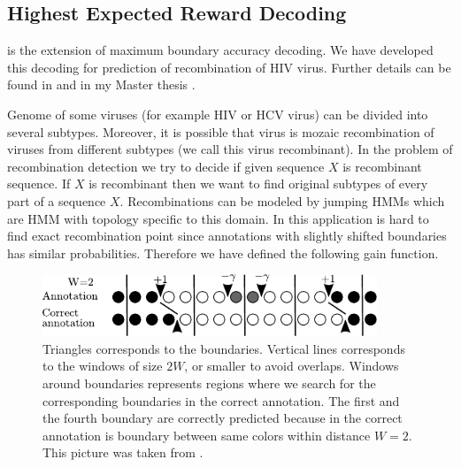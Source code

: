 \subsection{Highest Expected Reward Decoding}

 is the extension of maximum
boundary accuracy decoding. We have developed this decoding for prediction of
recombination of HIV virus.  Further details can be found in \cite{Nanasi2010}
and in my Master thesis \cite{Nanasi2010mgr}.


Genome of some viruses (for example HIV or HCV virus) can be divided into
several subtypes. Moreover, it is possible that virus is mozaic
recombination of viruses from different subtypes (we call this virus
recombinant). In the problem of recombination detection we try to decide if
given sequence $X$ is recombinant sequence. If $X$ is recombinant then we want to find
original subtypes of every part of a sequence $X$. Recombinations can be modeled
by jumping HMMs \cite{Schultz2006} which are HMM with topology specific to this domain.
In this application is 
hard to find exact recombination point since annotations with slightly shifted
boundaries has similar probabilities. Therefore we have defined the following gain
function.

\begin{figure}
\begin{center}
\includegraphics[width=10cm]{../figures/HERDbuddy.pdf}
\end{center}
\caption[Highest Expected Reward Decoding explanation]{
Triangles corresponds to the boundaries. Vertical lines corresponds to the windows
of size $2W$, or smaller to avoid overlaps. Windows around boundaries
represents regions where we search for the corresponding boundaries in the correct
annotation.
The first and the fourth boundary are correctly predicted because in the correct
annotation is boundary between same colors within distance $W=2$.
This picture was taken from \cite{Nanasi2010mgr}.
}\label{FIGURE:HERDBUDDY}
\end{figure}

